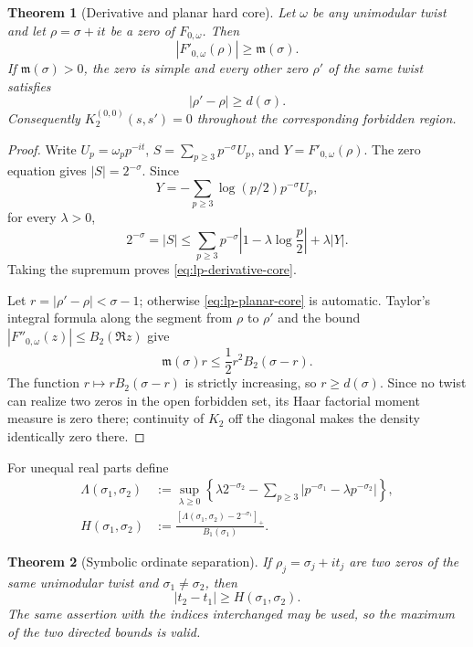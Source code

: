 \documentclass[11pt]{article}
\newtheorem{theorem}{Theorem}[section]
\theoremstyle{definition}
\theoremstyle{remark}
\begin{document}
\begin{theorem}[Derivative and planar hard core]
\label{thm:lp-planar-core}
Let $\omega$ be any unimodular twist and let $\rho=\sigma+it$ be a zero of
$F_{0,\omega}$.  Then
\begin{equation}
 \boxed{|F'_{0,\omega}(\rho)|\geq\mathfrak m(\sigma).}
 \label{eq:lp-derivative-core}
\end{equation}
If $\mathfrak m(\sigma)>0$, the zero is simple and every other zero $\rho'$ of
the same twist satisfies
\begin{equation}
 \boxed{|\rho'-\rho|\geq d(\sigma).}
 \label{eq:lp-planar-core}
\end{equation}
Consequently $K_2^{(0,0)}(s,s')=0$ throughout the corresponding forbidden
region.
\end{theorem}

\begin{proof}
Write $U_p=\omega_pp^{-it}$, $S=\sum_{p\geq3}p^{-\sigma}U_p$, and
$Y=F'_{0,\omega}(\rho)$.  The zero equation gives $|S|=2^{-\sigma}$.  Since
\[
 Y=-\sum_{p\geq3}\log(p/2)p^{-\sigma}U_p,
\]
for every $\lambda>0$,
\[
 2^{-\sigma}=|S|
 \leq\sum_{p\geq3}p^{-\sigma}
       \left|1-\lambda\log\frac p2\right|+\lambda|Y|.
\]
Taking the supremum proves \eqref{eq:lp-derivative-core}.

Let $r=|\rho'-\rho|<\sigma-1$; otherwise
\eqref{eq:lp-planar-core} is automatic.  Taylor's integral formula along the
segment from $\rho$ to $\rho'$ and the bound
$|F''_{0,\omega}(z)|\leq B_2(\Re z)$ give
\[
 \mathfrak m(\sigma)r
 \leq\frac12r^2B_2(\sigma-r).
\]
The function $r\mapsto rB_2(\sigma-r)$ is strictly increasing, so
$r\geq d(\sigma)$.  Since no twist can realize two zeros in the open forbidden
set, its Haar factorial moment measure is zero there; continuity of $K_2$ off
the diagonal makes the density identically zero there.
\end{proof}

For unequal real parts define
\begin{align}
 \Lambda(\sigma_1,\sigma_2)
 &:={\sup}_{\lambda\geq0}\left\{
 \lambda2^{-\sigma_2}
 -\sum_{p\geq3}|p^{-\sigma_1}-\lambda p^{-\sigma_2}|
 \right\},
 \label{eq:lp-Lambda}\\
 H(\sigma_1,\sigma_2)
 &:=\frac{[\Lambda(\sigma_1,\sigma_2)-2^{-\sigma_1}]_+}
          {B_1(\sigma_1)}.
 \label{eq:lp-H}
\end{align}

\begin{theorem}[Symbolic ordinate separation]
\label{thm:lp-ordinate-core}
If $\rho_j=\sigma_j+it_j$ are two zeros of the same unimodular twist and
$\sigma_1\neq\sigma_2$, then
\begin{equation}
 \boxed{|t_2-t_1|\geq H(\sigma_1,\sigma_2).}
 \label{eq:lp-ordinate-separation}
\end{equation}
The same assertion with the indices interchanged may be used, so the maximum
of the two directed bounds is valid.
\end{theorem}
\end{document}
